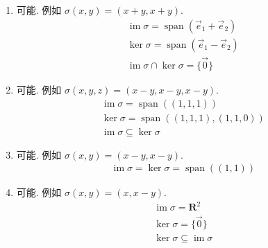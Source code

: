 \documentclass[UTF8,12pt,a4paper,fontset=fandol]{ctexart}
\begin{document}
\begin{solve}
\begin{enumerate}
                \item 可能. 例如 $ \sigma(x, y) = (x + y, x + y) $.
                      \begin{gather*}
                          \operatorname{im} \sigma = \operatorname{span}(\vec{e}_1 + \vec{e}_2) \\
                          \ker \sigma = \operatorname{span}(\vec{e}_1 - \vec{e}_2) \\
                          \operatorname{im} \sigma \cap \ker \sigma = \{\vec{0}\}
                      \end{gather*}

                \item 可能. 例如 $ \sigma(x, y, z) = (x - y, x - y, x - y) $.
                      \begin{gather*}
                          \operatorname{im} \sigma = \operatorname{span}((1, 1, 1)) \\
                          \ker \sigma = \operatorname{span}((1, 1, 1), (1, 1, 0)) \\
                          \operatorname{im} \sigma \subseteq \ker \sigma
                      \end{gather*}

                \item 可能. 例如 $ \sigma(x, y) = (x - y, x - y) $.
                      \begin{gather*}
                          \operatorname{im} \sigma = \ker \sigma = \operatorname{span}((1, 1))
                      \end{gather*}

                \item 可能. 例如 $ \sigma(x, y) = (x, x - y) $.
                      \begin{gather*}
                          \operatorname{im} \sigma = \mathbf{R}^2 \\
                          \ker \sigma = \{\vec{0}\} \\
                          \ker \sigma \subseteq \operatorname{im} \sigma
                      \end{gather*}
            \end{enumerate}
\end{solve}
\end{document}
